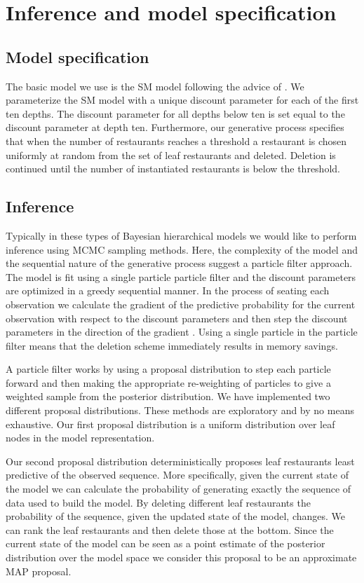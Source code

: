 \section{Inference and model specification}

\subsection{Model specification}

The basic model we use is the SM model following the advice of \cite{Gasthaus}.  We parameterize the SM model with a unique discount parameter for each of the first ten depths.  The discount parameter for all depths below ten is set equal to the discount parameter at depth ten.  Furthermore, our generative process specifies that when the number of restaurants reaches a threshold a restaurant is chosen uniformly at random from the set of leaf restaurants and deleted.  Deletion is continued until the number of instantiated restaurants is below the threshold.

\subsection{Inference}

Typically in these types of Bayesian hierarchical models we would like to perform inference using MCMC sampling methods.  Here, the complexity of the model and the sequential nature of the generative process suggest a particle filter approach. The model is fit using a single particle particle filter and the discount parameters are optimized in a greedy sequential manner.  In the process of seating each observation we calculate the gradient of the predictive probability for the current observation with respect to the discount parameters and then step the discount parameters in the direction of the gradient \cite{Gasthaus}.  Using a single particle in the particle filter means that the deletion scheme immediately results in memory savings.

A particle filter works by using a proposal distribution to step each particle forward and then making the appropriate re-weighting of particles to give a weighted sample from the posterior distribution. We have implemented two different proposal distributions.  These methods are exploratory and by no means exhaustive.  Our first proposal distribution is a uniform distribution over leaf nodes in the model representation.  

Our second proposal distribution deterministically proposes leaf restaurants least predictive of the observed sequence. More specifically, given the current state of the model we can calculate the probability of generating exactly the sequence of data used to build the model.  By deleting different leaf restaurants the probability of the sequence, given the updated state of the model, changes.  We can rank the leaf restaurants and then delete those at the bottom.  Since the current state of the model can be seen as a point estimate of the posterior distribution over the model space we consider this proposal to be an approximate MAP proposal.


